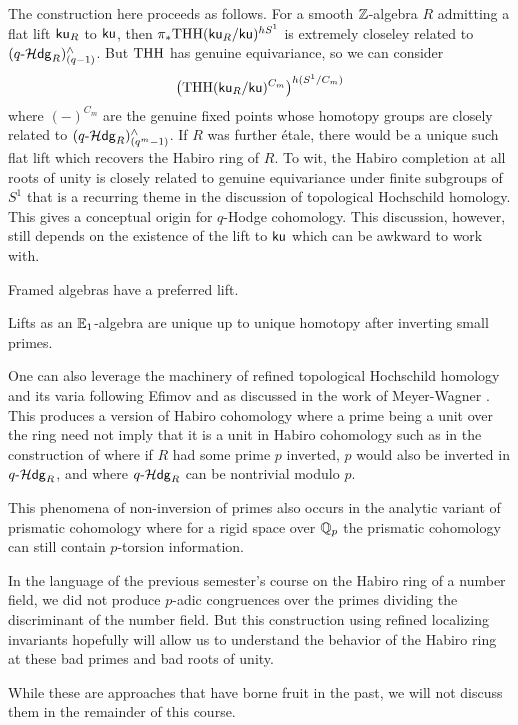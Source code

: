 The construction here proceeds as follows. For a smooth $\mathbb{Z}$-algebra $R$ admitting a flat lift $\mathsf{ku}_{R}$ to $\mathsf{ku}$, then $\pi_{*}\mathrm{THH}(\mathsf{ku}_{R}/\mathsf{ku})^{hS^{1}}$ is extremely closeley related to $(q\text{-}\mathcal{H}\mathsf{dg}_{R})^{\wedge}_{(q-1)}$. But $\mathrm{THH}$ has genuine equivariance, so we can consider $$\left(\mathrm{THH}(\mathsf{ku}_{R}/\mathsf{ku})^{C_{m}}\right)^{h(S^{1}/C_{m})}$$ where $(-)^{C_{m}}$ are the genuine fixed points whose homotopy groups are closely related to $(q\text{-}\mathcal{H}\mathsf{dg}_{R})^{\wedge}_{(q^{m}-1)}$. If $R$ was further \'{e}tale, there would be a unique such flat lift which recovers the Habiro ring of $R$. To wit, the Habiro completion at all roots of unity is closely related to genuine equivariance under finite subgroups of $S^{1}$ that is a recurring theme in the discussion of topological Hochschild homology. This gives a conceptual origin for $q$-Hodge cohomology. This discussion, however, still depends on the existence of the lift to $\mathsf{ku}$ which can be awkward to work with.
\begin{example}
    Framed algebras have a preferred lift. 
\end{example}
\begin{example}
    Lifts as an $\mathbb{E}_{1}$-algebra are unique up to unique homotopy after inverting small primes. 
\end{example} 
One can also leverage the machinery of refined topological Hochschild homology and its varia following Efimov and as discussed in the work of Meyer-Wagner \cite{MeyerWagner}. This produces a version of Habiro cohomology where a prime being a unit over the ring need not imply that it is a unit in Habiro cohomology such as in the construction of  where if $R$ had some prime $p$ inverted, $p$ would also be inverted in $q\text{-}\mathcal{H}\mathsf{dg}_{R}$, and where $q\text{-}\mathcal{H}\mathsf{dg}_{R}$ can be nontrivial modulo $p$. 
\begin{remark}
    This phenomena of non-inversion of primes also occurs in the analytic variant of prismatic cohomology where for a rigid space over $\mathbb{Q}_{p}$ the prismatic cohomology can still contain $p$-torsion information. 
\end{remark}
\begin{remark}
    In the language of the previous semester's course on the Habiro ring of a number field, we did not produce $p$-adic congruences over the primes dividing the discriminant of the number field. But this construction using refined localizing invariants hopefully will allow us to understand the behavior of the Habiro ring at these bad primes and bad roots of unity. 
\end{remark}
While these are approaches that have borne fruit in the past, we will not discuss them in the remainder of this course. 

